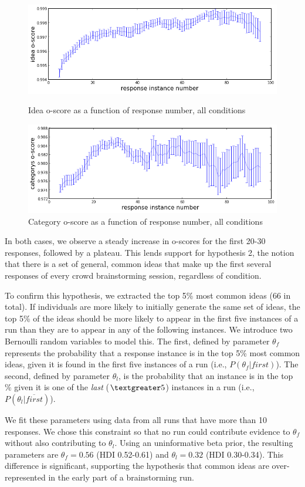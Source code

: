 \begin{figure}[h]
    \centering
    \includegraphics[width=0.9\columnwidth]{idea_oscore_order}
    \caption{Idea o-score as a function of response number, all conditions}
    \label{fig:idea_oscore_order}
    \includegraphics[width=0.9\columnwidth]{cat_oscore_order}
    \caption{Category o-score as a function of response number, all conditions}
    \label{fig:cat_oscore_order}
\end{figure}

In both cases, we observe a steady increase in o-scores for the first 20-30 responses, followed by a plateau.
This lends support for hypothesis 2, the notion that there is a set of general, common ideas that make up the first several responses of every crowd brainstorming session, regardless of condition.

To confirm this hypothesis, we extracted the top 5\% most common ideas (66 in total). If individuals are more likely to initially generate the same set of ideas, the top 5\% of the ideas should be more likely to appear in the first five instances of a run than they are to appear in any of the following instances. We introduce two Bernoulli random variables to model this. The first, defined by parameter $\theta_f$ represents the probability that a response instance is in the top 5\% most common ideas, given it is found in the first five instances of a run (i.e., $P(\theta_f|first)$). The second, defined by parameter $\theta_l$, is the probability that an instance is in the top \% given it is one of the \emph{last} ($\textgreater5$) instances in a run (i.e., $P(\theta_l|\overline{first})$).

We fit these parameters using data from all runs that have more than 10 responses. We chose this constraint so that no run could contribute evidence to $\theta_f$ without also contributing to $\theta_l$. Using an uninformative beta prior, the resulting parameters are $\theta_f = 0.56$ (HDI 0.52-0.61) and $\theta_l = 0.32$ (HDI 0.30-0.34). This difference is significant, supporting the hypothesis that common ideas are over-represented in the early part of a brainstorming run.


